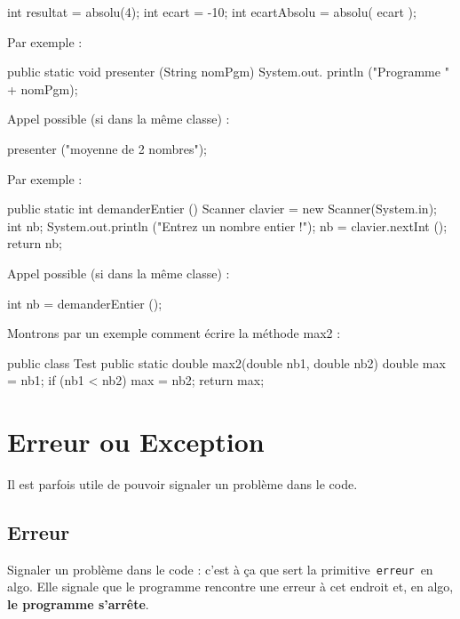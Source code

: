 \documentclass[11pt,a4paper]{article}
\begin{document}
            \par
        \begin{Java}

int resultat = absolu(4);
int ecart = -10;
int ecartAbsolu = absolu( ecart );
				\end{Java}Par exemple : 
            \par
        \begin{Java}

public static void presenter (String nomPgm) {
    System.out. println ("Programme " + nomPgm);
}				\end{Java}
        Appel possible (si dans la m\^eme classe) :
      
            \par
        \begin{Java}

presenter ("moyenne de 2 nombres");
				\end{Java}Par exemple : 
            \par
        \begin{Java}

public static int demanderEntier () {
    Scanner clavier = new Scanner(System.in);
    int nb;
    System.out.println ("Entrez un nombre entier !");
    nb = clavier.nextInt ();
    return nb;
}				\end{Java}
        Appel possible (si dans la m\^eme classe) :
      
            \par
        \begin{Java}

int nb = demanderEntier ();
				\end{Java}Montrons par un exemple comment \'ecrire la m\'ethode max2 : 
            \par
        \begin{Java}

public class Test{
  public static double max2(double nb1, double nb2){
    double max = nb1;
    if (nb1 < nb2) {
      max = nb2;
    }
    return max;
  }
}				\end{Java}\section{Erreur ou Exception}
          Il est parfois utile de pouvoir signaler un probl\`eme dans le code. 
        
            \par
        \subsection{Erreur}
          Signaler un probl\`eme dans le code : c'est \`a \c ca que sert la primitive \,\verb|erreur|\, en algo.
          Elle signale que le programme rencontre une erreur \`a cet endroit et, en algo, 
          \textbf{le programme s'arr\^ete}.
      
\end{document}
